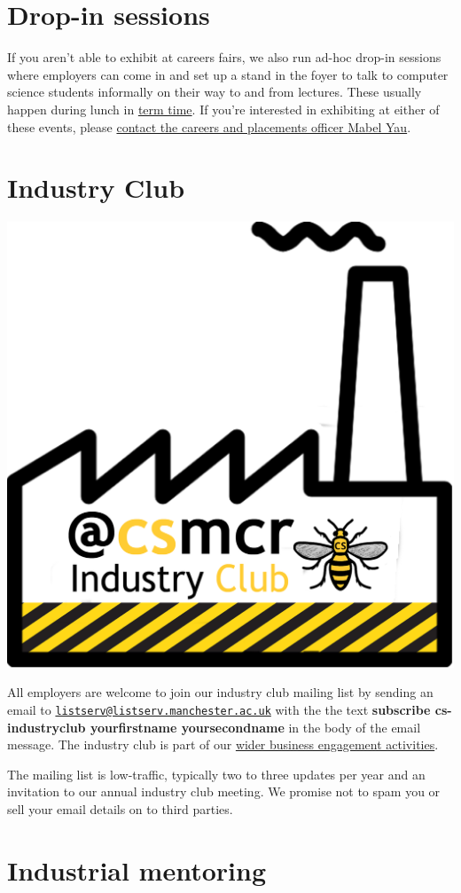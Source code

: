 \documentclass[12pt,]{book}
\begin{document}
\hypertarget{drop-in-sessions}{%
\section{Drop-in sessions}\label{drop-in-sessions}}

If you aren't able to exhibit at careers fairs, we also run ad-hoc drop-in sessions where employers can come in and set up a stand in the foyer to talk to computer science students informally on their way to and from lectures. These usually happen during lunch in \href{https://www.manchester.ac.uk/discover/key-dates/}{term time}. If you're interested in exhibiting at either of these events, please \protect\hyperlink{contact}{contact the careers and placements officer Mabel Yau}.

\hypertarget{industry-club}{%
\section{Industry Club}\label{industry-club}}

\begin{center}\includegraphics[width=0.4\linewidth]{images/industry-club-black} \end{center}

All employers are welcome to join our industry club mailing list by sending an email to \href{mailto:listserv@listserv.manchester.ac.uk}{\nolinkurl{listserv@listserv.manchester.ac.uk}} with the the text \textbf{subscribe cs-industryclub yourfirstname yoursecondname} in the body of the email message. The industry club is part of our \href{https://www.cs.manchester.ac.uk/connect/business-engagement/}{wider business engagement activities}.

The mailing list is low-traffic, typically two to three updates per year and an invitation to our annual industry club meeting. We promise not to spam you or sell your email details on to third parties.

\hypertarget{industrial-mentoring}{%
\section{Industrial mentoring}\label{industrial-mentoring}}
\end{document}

